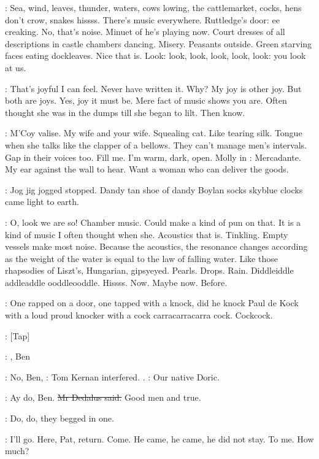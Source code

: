 \BloomInt:
Sea,
wind,
leaves,
thunder,
waters,
cows lowing,
the cattlemarket,
cocks,
hens don't crow,
snakes hissss.
There's music everywhere.
Ruttledge's door:
ee creaking.
No,
that's noise.
Minuet of
he's playing now.
Court dresses of all descriptions in castle chambers
dancing.
Misery.
Peasants outside.
Green starving faces eating
dockleaves.
Nice that is.
Look:
look,
look,
look,
look,
look:
you
look at us.

\BloomInt:
That's joyful I can feel.
Never have written it.
Why?
My joy is other
joy.
But both are joys.
Yes,
joy it must be.
Mere fact of music shows you
are.
Often thought she was in the dumps till she began to lilt.
Then
know.

\BloomInt:
M'Coy valise.
My wife and your wife.
Squealing cat.
Like tearing silk.
Tongue when she talks like the clapper of a bellows.
They can't manage
men's intervals.
Gap in their voices too.
Fill me.
I'm warm,
dark,
open.
Molly in :
Mercadante.
My ear against the wall to hear.
Want
a woman who can deliver the goods.

\BloomInt:
Jog jig jogged stopped.
Dandy tan shoe of dandy Boylan socks
skyblue clocks came light to earth.

\BloomInt:
O,
look we are so!
Chamber music.
Could make a kind of pun on
that.
It is a kind of music I often thought when she.
Acoustics that is.
Tinkling.
Empty vessels make most noise.
Because the acoustics,
the
resonance changes according as the weight of the water is equal to the law
of falling water.
Like those rhapsodies of Liszt's,
Hungarian,
gipsyeyed.
Pearls.
Drops.
Rain.
Diddleiddle addleaddle ooddleooddle.
Hissss.
Now.
Maybe now.
Before.

\BloomInt:
One rapped on a door,
one tapped with a knock,
did he knock Paul
de Kock with a loud proud knocker with a cock carracarracarra cock.
Cockcock.

\stripling:
[Tap]

\cowley:
,
Ben

:
No,
Ben,
:
Tom Kernan interfered.
.
:
Our native Doric.

\simon:
Ay do,
Ben.
\sout{Mr Dedalus said.}
Good men and true.

:
Do,
do,
they begged in one.

\BloomInt:
I'll go.
Here,
Pat,
return.
Come.
He came,
he came,
he did not stay.
To me.
How much?

